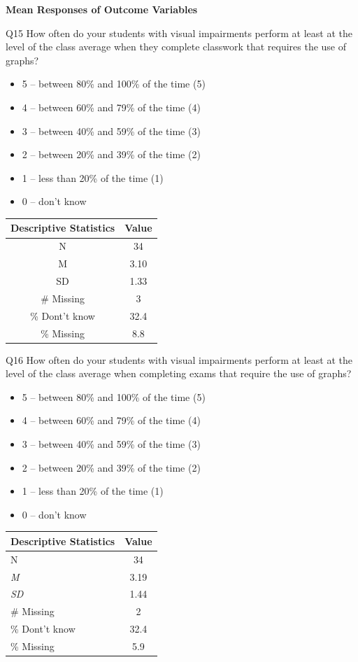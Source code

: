 \documentclass[11.5pt]{sig-alternate} %
\begin{document}
\begin{large}
\textbf{Mean Responses of Outcome Variables}

Q15 How often do your students with visual impairments perform at least at the level  of the class average when they complete classwork that requires the use of graphs? 

 \begin{itemize}
     \item 5 – between 80\% and 100\% of the time (5)
     \item 4 – between 60\% and 79\% of the time (4)
     \item 3 – between 40\% and 59\% of the time (3)
     \item 2 – between 20\% and 39\% of the time (2)
     \item 1 – less than 20\% of the time (1)
     \item 0 – don’t know
 \end{itemize}
\begin{table}[h]
\centering
\begin{tabular}{cc}
Descriptive Statistics & Value\\ \hline
N  & 34 \\
M &	3.10\\
SD	& 1.33\\
\# Missing &	3\\
\% Dont't know & 32.4\\
\% Missing & 8.8\\
\end{tabular}
\end{table}

Q16 How often do your students with visual impairments perform at least at the level  of the class average when completing exams that require the use of graphs? 

\begin{itemize}
    \item 5 – between 80\% and 100\% of the time (5)
    \item 4 – between 60\% and 79\% of the time (4)
    \item 	3 – between 40\% and 59\% of the time (3)
    \item 2 – between 20\% and 39\% of the time (2)
    \item 	1 – less than 20\% of the time (1)
    \item 	0 – don’t know
\end{itemize}
\begin{table}[h]
\centering
\begin{tabular}{lc}
Descriptive Statistics & Value\\ \hline
N  & 34 \\
\textit{M} &	3.19\\
\textit{SD}	& 1.44\\
\# Missing &	2\\
\% Dont't know & 32.4\\
\% Missing & 5.9\\
\end{tabular}
\end{table}


\end{large}
\end{document}
